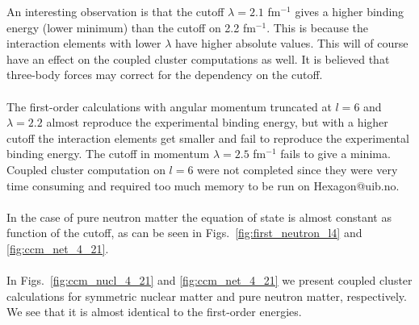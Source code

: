 An interesting observation is that the
cutoff  $\lambda=2.1$ fm$^{-1}$ gives a higher binding energy (lower minimum) than the cutoff
on 2.2 fm$^{-1}$. This is because the  interaction elements with lower $\lambda$
have higher absolute values. This will of course have an effect on the coupled cluster
computations as well. It is believed that three-body forces may correct for the dependency on the cutoff.\\
\\
The first-order calculations with angular momentum truncated at $l=6$ and 
$\lambda=2.2$ almost reproduce the experimental binding energy, but with a 
higher cutoff the interaction elements get smaller and fail to reproduce the 
experimental binding energy. The cutoff in momentum $\lambda=2.5$ fm$^{-1}$ fails to give a minima. Coupled cluster computation on $l=6$ were not 
completed since they were very time consuming and required too much memory to be run on Hexagon@uib.no.\\
\\
In the case of pure neutron matter the equation of state is almost 
constant as function of the cutoff, as can be seen in Figs.~\ref{fig:first_neutron_l4} and \ref{fig:ccm_net_4_21}.\\
\\
In Figs.~\ref{fig:ccm_nucl_4_21} and \ref{fig:ccm_net_4_21} we present coupled cluster calculations for symmetric nuclear matter and pure neutron matter, respectively.
We see that it is almost identical to the first-order energies.%
%
